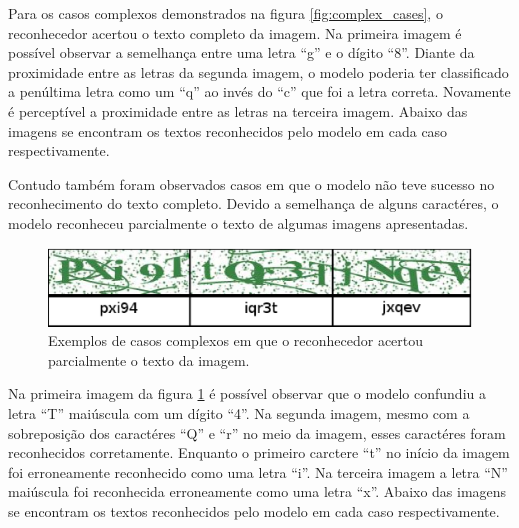 Para os casos complexos demonstrados na figura
\ref{fig:complex_cases}, o reconhecedor acertou o texto completo da
imagem. Na primeira imagem é possível observar a semelhança entre uma
letra ``g'' e o dígito ``8''. Diante da proximidade entre as letras da
segunda imagem, o modelo poderia ter classificado a penúltima letra
como um ``q'' ao invés do ``c'' que foi a letra correta. Novamente
é perceptível a proximidade entre as letras na terceira imagem. Abaixo
das imagens se encontram os textos reconhecidos pelo modelo em cada
caso respectivamente.

Contudo também foram observados casos em que o modelo não teve sucesso
no reconhecimento do texto completo. Devido a semelhança de alguns
caractéres, o modelo reconheceu parcialmente o texto de algumas
imagens apresentadas.

\begin{figure}[H]
\centering
\includegraphics[scale=0.8]{imagens/harder_cases}
\caption{Exemplos de casos complexos em que o reconhecedor acertou
  parcialmente o texto da imagem.}
\label{fig:harder_cases}
\end{figure}

Na primeira imagem da figura \ref{fig:harder_cases} é possível observar
que o modelo confundiu a letra ``T'' maiúscula com um dígito ``4''. Na
segunda imagem, mesmo com a sobreposição dos caractéres ``Q'' e ``r''
no meio da imagem, esses caractéres foram reconhecidos
corretamente. Enquanto o primeiro carctere ``t'' no início da imagem
foi erroneamente reconhecido como uma letra ``i''. Na terceira imagem
a letra ``N'' maiúscula foi reconhecida erroneamente como uma letra
``x''. Abaixo das imagens se encontram os textos reconhecidos pelo
modelo em cada caso respectivamente.
